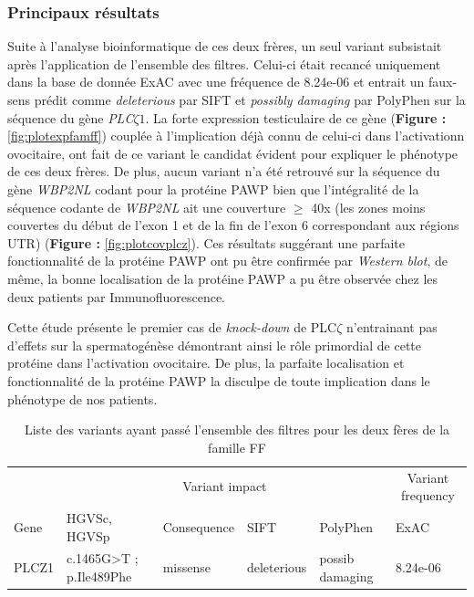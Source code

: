 \documentclass[12pt,twoside]{reedthesis}
\theoremstyle{definition}
\theoremstyle{definition}
\theoremstyle{remark}
\begin{document}
  \newpage
  
  
  
  \newpage
  
  \subsubsection{Principaux résultats}\label{principaux-resultats-3}
  
  Suite à l'analyse bioinformatique de ces deux frères, un seul variant
  subsistait après l'application de l'ensemble des filtres. Celui-ci était
  recancé uniquement dans la base de donnée ExAC avec une fréquence de
  8.24e-06 et entrait un faux-sens prédit comme \emph{deleterious} par
  SIFT et \emph{possibly damaging} par PolyPhen sur la séquence du gène
  \emph{PLC}\(\zeta 1\). La forte expression testiculaire de ce gène
  (\textbf{Figure : }\ref{fig:plotexpfamff}) couplée à l'implication déjà
  connu de celui-ci dans l'activationn ovocitaire, ont fait de ce variant
  le candidat évident pour expliquer le phénotype de ces deux frères. De
  plus, aucun variant n'a été retrouvé sur la séquence du gène
  \emph{WBP2NL} codant pour la protéine PAWP bien que l'intégralité de la
  séquence codante de \emph{WBP2NL} ait une couverture \(\ge\) 40x (les
  zones moins couvertes du début de l'exon 1 et de la fin de l'exon 6
  correspondant aux régions UTR) (\textbf{Figure :
  }\ref{fig:plotcovplcz}). Ces résultats suggérant une parfaite
  fonctionnalité de la protéine PAWP ont pu être confirmée par
  \emph{Western blot}, de même, la bonne localisation de la protéine PAWP
  a pu être observée chez les deux patients par Immunofluorescence.
  
  Cette étude présente le premier cas de \emph{knock-down} de PLC\(\zeta\)
  n'entrainant pas d'effets sur la spermatogénèse démontrant ainsi le rôle
  primordial de cette protéine dans l'activation ovocitaire. De plus, la
  parfaite localisation et fonctionnalité de la protéine PAWP la disculpe
  de toute implication dans le phénotype de nos patients.
  
  \begin{longtable}[t]{llllll}
  \caption{\label{tab:tabrecapff}Liste des variants ayant passé l'ensemble des filtres pour les deux fères de la famille FF}\\
  \toprule
  \multicolumn{1}{c}{ } & \multicolumn{4}{c}{Variant impact} & \multicolumn{1}{c}{Variant frequency} \\
  \cmidrule(l{2pt}r{2pt}){2-5} \cmidrule(l{2pt}r{2pt}){6-6}
  Gene & HGVSc, HGVSp & Consequence & SIFT & PolyPhen & ExAC\\
  \midrule
  PLCZ1 & c.1465G>T ; p.Ile489Phe & missense & deleterious & possib damaging & 8.24e-06\\
  \bottomrule
  \end{longtable}
  
\end{document}
